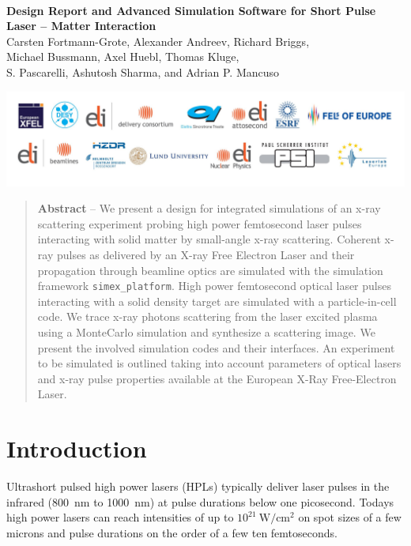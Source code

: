 \documentclass[12pt]{scrartcl}
\begin{document}
\makeatletter
\begin{titlepage}
\thispagestyle{scrheadings}
\begin{center}
$~$\\
\vspace{2cm}
\Huge{\textbf{Design Report and Advanced Simulation Software for Short Pulse Laser -- Matter Interaction}}\\[5mm]
\vspace{2cm}
\large{
Carsten Fortmann-Grote, Alexander Andreev, Richard Briggs,\\ Michael Bussmann,
  Axel Huebl, Thomas Kluge,\\
 S. Pascarelli, Ashutosh Sharma, and Adrian P. Mancuso\\
 }
\vspace{1cm}
\@date
\end{center}
\vspace{5cm}
\includegraphics[width=\textwidth]{./PartnerLogos.pdf}
\normalfont
\end{titlepage}
\makeatother

\tableofcontents
\begin{abstract}
  \noindent%
  \textbf{Abstract} -- We present a design for integrated simulations of an x-ray scattering
  experiment probing high power femtosecond laser pulses interacting with solid
  matter by small-angle x-ray scattering.
  Coherent x-ray pulses as delivered by an X-ray Free Electron Laser
  and their propagation through beamline optics are simulated with the
  simulation framework \texttt{simex\_platform}. High power femtosecond optical
  laser pulses interacting with a solid density target are simulated with
  a particle-in-cell code. We trace x-ray photons scattering from the laser excited
  plasma using a MonteCarlo simulation and synthesize a scattering image.
  We present the involved simulation codes and their interfaces.
  An experiment to be simulated is outlined taking into account parameters of optical lasers and
  x-ray pulse properties available at the European X-Ray Free-Electron Laser.
\end{abstract}
%
\section{Introduction} Ultrashort pulsed high power lasers (HPLs) typically deliver laser
pulses in the infrared (800~nm to 1000~nm) at pulse durations below one
picosecond. Todays high power lasers \cite{Siebold2008} can reach intensities of
up to $10^{21}~\text{W}/\text{cm}^2$ on spot sizes of a few microns and pulse
durations on the order of a few ten femtoseconds.
\end{document}
